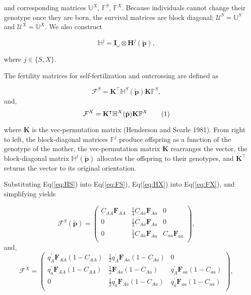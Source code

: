 \documentclass[11pt]{article}
\newcommand\numberthis{\addtocounter{equation}{1}\tag{\theequation}}
\def\mbf#1{\mathbf{#1}}
\def\mbb#1{\mathbb{#1}}
\def\mcal#1{\mathcal{#1}}
\begin{document}
\noindent and corresponding matrices $\mbb{U}^X$, $\mbb{F}^S$, $\mbb{F}^X$. Because individuals cannot change their genotype once they are born, the survival matrices are block diagonal; $\mcal{U}^S = \mbb{U}^S$ and $\mcal{U}^X = \mbb{U}^X$. We also construct

\begin{equation}
	\mbb{H}^j = \mbf{I}_{\omega} \otimes \mbf{H}^j(\tilde{\mbf{p}}),
\end{equation}

\noindent where $j \in \{S,X\}$.

The fertility matrices for self-fertilization and outcrossing are defined as

\begin{equation} \label{eq:FS}
	\mcal{F}^S = \mbf{K}^{\intercal} \mbb{H}^S(\tilde{\mbf{p}}) \mbf{K} \mbb{F}^S, 
\end{equation}
\noindent and, 
\begin{equation} \label{eq:FX}
	\mcal{F}^X = \mbf{K}^{\intercal} \mbb{H}^X(\tilde{\mbf{p}}) \mbf{K} \mbb{F}^X \numberthis
\end{equation}

\noindent where $\mbf{K}$ is the vec-permutation matrix (Henderson and Searle 1981). From right to left, the block-diagonal matrices $\mbb{F}^j$ produce offspring as a function of the genotype of the mother, the vec-permutation matrix $\mbf{K}$ rearranges the vector, the block-diagonal
matrix $\mbb{H}^j(\tilde{\mbf{p}})$ allocates the offspring to their genotypes, and $\mbf{K}^{\intercal}$ returns the vector to its original orientation.

Substituting Eq(\ref{eq:HS}) into Eq(\ref{eq:FS}), Eq(\ref{eq:HX}) into Eq(\ref{eq:FX}), and simplifying yields

\begin{equation} \label{eq:FSsimp}
	\mcal{F}^S(\tilde{\mbf{p}}) = 
			\left(
			\begin{array}{c|c|c}
				C_{AA} \mbf{F}_{AA} & \frac{1}{4} C_{Aa} \mbf{F}_{Aa} & 0 \\ \hline
				0 & \frac{1}{2} C_{Aa} \mbf{F}_{Aa} & 0 \\ \hline
				0 & \frac{1}{4} C_{Aa} \mbf{F}_{Aa} & C_{aa} \mbf{F}_{aa}\\
			\end{array} \right), 
\end{equation}
\noindent and, 
\begin{equation} \label{eq:FXsimp}
	\mcal{F}^X = 
			\left(
			\begin{array}{c|c|c}
				q^{\prime}_{A} \mbf{F}_{AA} (1 - C_{AA})& \frac{1}{2} q^{\prime}_{A} \mbf{F}_{Aa} (1 - C_{Aa}) & 0 \\ \hline
				q^{\prime}_{a} \mbf{F}_{AA} (1 - C_{AA}) & \frac{1}{2} \mbf{F}_{Aa} (1 - C_{Aa}) & q^{\prime}_{A} \mbf{F}_{aa} (1 - C_{aa}) \\ \hline
				0 & \frac{1}{2} q^{\prime}_{a} \mbf{F}_{Aa} (1 - C_{Aa})& q^{\prime}_{a} \mbf{F}_{aa} (1 - C_{aa}) \\
			\end{array} \right), 
\end{equation}
\end{document}
